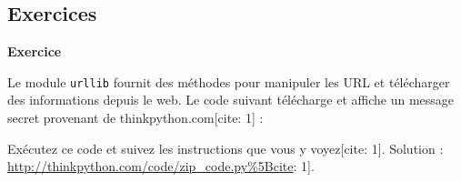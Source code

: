 \hypertarget{exercices}{%
\subsection{Exercices}\label{exercices}}

\textbf{Exercice}

Le module \texttt{urllib} fournit des méthodes pour manipuler les URL et
télécharger des informations depuis le web. Le code suivant télécharge
et affiche un message secret provenant de thinkpython.com{[}cite: 1{]} :

\begin{Shaded}
\begin{Highlighting}[]

\OperatorTok{=}\NormalTok{)}
\end{Highlighting}
\end{Shaded}

Exécutez ce code et suivez les instructions que vous y voyez{[}cite:
1{]}. Solution : \url{http://thinkpython.com/code/zip_code.py\%5Bcite}:
1{]}.
